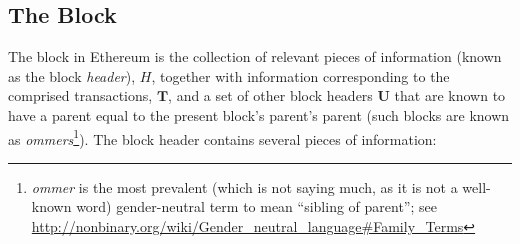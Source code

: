 \documentclass[9pt,oneside]{amsart}
\begin{document}
\begin{multicols}{2}
\subsection{The Block} \label{ch:block}

The block in Ethereum is the collection of relevant pieces of information (known as the block \textit{header}), $H$, together with information corresponding to the comprised transactions, $\mathbf{T}$, and a set of other \hypertarget{ommerheaders}{block headers $\mathbf{U}$} that are known to have a parent equal to the present block's parent's parent (such blocks are known as \textit{ommers}\footnote{\textit{ommer} is the most prevalent (which is not saying much, as it is not a well-known word) gender-neutral term to mean ``sibling of parent''; see \url{http://nonbinary.org/wiki/Gender_neutral_language\#Family_Terms}}). The block header contains several pieces of information:



\end{multicols}
\end{document}
